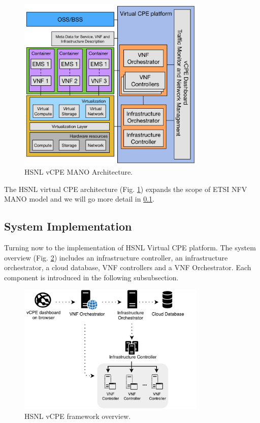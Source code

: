 \begin{figure}[!t]
\centering
\includegraphics[width=0.8\textwidth]{./fig/hsnl_vcpe_architecture}
\caption{HSNL vCPE MANO Architecture.}
\label{fig:hsnl_vcpe_architecture}
\end{figure}

The HSNL virtual CPE architecture (Fig. \ref{fig:hsnl_vcpe_architecture}) expands the scope of ETSI NFV MANO model and we will go more detail in \ref{ssec:hsnl_system_imple}.


\subsection{System Implementation} \label{ssec:hsnl_system_imple}
Turning now to the implementation of HSNL Virtual CPE platform.  The system overview (Fig. \ref{fig:hsnl_vcpe_framework}) includes an infrastructure controller, an infrastructure orchestrator, a cloud database, VNF controllers and a VNF Orchestrator. Each component is introduced in the following subsubsection.

\begin{figure}[!t]
\centering
\includegraphics[width=0.8\textwidth]{./fig/hsnl_vcpe_framework}
\caption{HSNL vCPE framework overview.}
\label{fig:hsnl_vcpe_framework}
\end{figure}

